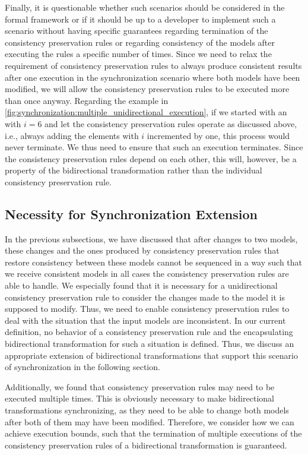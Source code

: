 Finally, it is questionable whether such scenarios should be considered in the formal framework or if it should be up to a developer to implement such a scenario without having specific guarantees regarding termination of the consistency preservation rules or regarding consistency of the models after executing the rules a specific number of times.
Since we need to relax the requirement of consistency preservation rules to always produce consistent results after one execution in the synchronization scenario where both models have been modified, we will allow the consistency preservation rules to be executed more than once anyway.
Regarding the example in \autoref{fig:synchronization:multiple_unidirectional_execution}, if we started with an  with $i = 6$ and let the consistency preservation rules operate as discussed above, i.e., always adding the elements with $i$ incremented by one, this process would never terminate.
We thus need to ensure that such an execution terminates.
Since the consistency preservation rules depend on each other, this will, however, be a property of the bidirectional transformation rather than the individual consistency preservation rule.


\subsection{Necessity for Synchronization Extension}

In the previous subsections, we have discussed that after changes to two models, these changes and the ones produced by consistency preservation rules that restore consistency between these models cannot be sequenced in a way such that we receive consistent models in all cases the consistency preservation rules are able to handle.
We especially found that it is necessary for a unidirectional consistency preservation rule to consider the changes made to the model it is supposed to modify.
Thus, we need to enable consistency preservation rules to deal with the situation that the input models are inconsistent.
In our current definition, no behavior of a consistency preservation rule and the encapsulating bidirectional transformation for such a situation is defined.
Thus, we discuss an appropriate extension of bidirectional transformations that support this scenario of synchronization in the following section.

Additionally, we found that consistency preservation rules may need to be executed multiple times.
This is obviously necessary to make bidirectional transformations synchronizing, as they need to be able to change both models after both of them may have been modified.
Therefore, we consider how we can achieve execution bounds, such that the termination of multiple executions of the consistency preservation rules of a bidirectional transformation is guaranteed.



